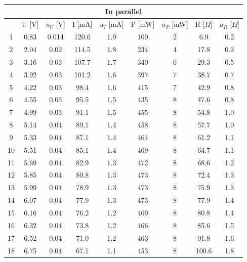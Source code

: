 \documentclass[a4paper,12pt]{article}
\begin{document}
\begin{table}[H]
\begin{center}
\begin{tabular}{|c|c|c|c|c|c|c|c|c|}
\hline
\multicolumn{9}{|c|}{In parallel} \\ \hline
 & U {[}V{]} & $u_U$ {[}V{]} & I {[}mA{]} & $u_I$ {[}mA{]} & P {[}mW{]} & $u_P$ {[}mW{]} & R {[}$\Omega${]} & $u_R$ {[}$\Omega${]} \\ \hline
    1     & 0.83  & 0.014  & 120.6  & 1.9   & 100  & 2   & 6.9   & 0.2  \\ \hline
    2     & 2.04  & 0.02  & 114.5  & 1.8   & 234   & 4     & 17.8  & 0.3  \\ \hline
    3     & 3.16  & 0.03  & 107.7  & 1.7   & 340   & 6     & 29.3  & 0.5  \\ \hline
    4     & 3.92  & 0.03  & 101.2  & 1.6   & 397   & 7     & 38.7  & 0.7  \\ \hline
    5     & 4.22  & 0.03  & 98.4  & 1.6   & 415   & 7     & 42.9  & 0.8  \\ \hline
    6     & 4.55  & 0.03  & 95.5  & 1.5   & 435   & 8     & 47.6  & 0.8  \\ \hline
    7     & 4.99  & 0.03  & 91.1  & 1.5   & 455   & 8     & 54.8  & 1.0  \\ \hline
    8     & 5.14  & 0.04  & 89.1  & 1.4   & 458   & 8     & 57.7  & 1.0  \\ \hline
    9     & 5.33  & 0.04  & 87.1  & 1.4   & 464   & 8     & 61.2  & 1.1  \\ \hline
    10    & 5.51  & 0.04  & 85.1  & 1.4   & 469   & 8     & 64.7  & 1.1  \\ \hline
    11    & 5.69  & 0.04  & 82.9  & 1.3   & 472   & 8     & 68.6  & 1.2  \\ \hline
    12    & 5.85  & 0.04  & 80.8  & 1.3   & 473   & 8     & 72.4  & 1.3  \\ \hline
    13    & 5.99  & 0.04  & 78.9  & 1.3   & 473   & 8     & 75.9  & 1.3  \\ \hline
    14    & 6.07  & 0.04  & 77.9  & 1.3   & 473   & 8     & 77.9  & 1.4  \\ \hline
    15    & 6.16  & 0.04  & 76.2  & 1.2   & 469   & 8     & 80.8  & 1.4  \\ \hline
    16    & 6.32  & 0.04  & 73.8  & 1.2   & 466   & 8     & 85.6  & 1.5  \\ \hline
    17    & 6.52  & 0.04  & 71.0  & 1.2   & 463   & 8     & 91.8  & 1.6  \\ \hline
    18    & 6.75  & 0.04  & 67.1  & 1.1   & 453   & 8     & 100.6  & 1.8  \\ \hline

\end{tabular}
\end{center}
\end{table}
\end{document}
